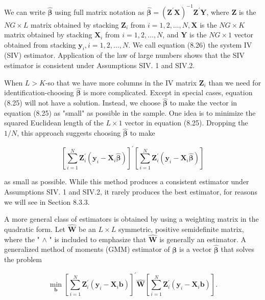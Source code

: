 \documentclass[10pt]{article}
\begin{document}
We can write $\hat{\boldsymbol{\beta}}$ using full matrix notation as $\hat{\boldsymbol{\beta}}=\left(\mathbf{Z}^{\prime} \mathbf{X}\right)^{-1} \mathbf{Z}^{\prime} \mathbf{Y}$, where $\mathbf{Z}$ is the $N G \times L$ matrix obtained by stacking $\mathbf{Z}_{i}$ from $i=1,2, \ldots, N, \mathbf{X}$ is the $N G \times K$ matrix obtained by stacking $\mathbf{X}_{i}$ from $i=1,2, \ldots, N$, and $\mathbf{Y}$ is the $N G \times 1$ vector obtained from stacking $\mathbf{y}_{i}, i=1,2, \ldots, N$. We call equation (8.26) the system IV (SIV) estimator. Application of the law of large numbers shows that the SIV estimator is consistent under Assumptions SIV. 1 and SIV.2.

When $L>K$-so that we have more columns in the IV matrix $\mathbf{Z}_{i}$ than we need for identification-choosing $\hat{\boldsymbol{\beta}}$ is more complicated. Except in special cases, equation (8.25) will not have a solution. Instead, we choose $\hat{\boldsymbol{\beta}}$ to make the vector in equation (8.25) as "small" as possible in the sample. One idea is to minimize the squared Euclidean length of the $L \times 1$ vector in equation (8.25). Dropping the $1 / N$, this approach suggests choosing $\hat{\boldsymbol{\beta}}$ to make

$$
\left[\sum_{i=1}^{N} \mathbf{Z}_{i}^{\prime}\left(\mathbf{y}_{i}-\mathbf{X}_{i} \hat{\boldsymbol{\beta}}\right)\right]^{\prime}\left[\sum_{i=1}^{N} \mathbf{Z}_{i}^{\prime}\left(\mathbf{y}_{i}-\mathbf{X}_{i} \hat{\boldsymbol{\beta}}\right)\right]
$$

as small as possible. While this method produces a consistent estimator under Assumptions SIV. 1 and SIV.2, it rarely produces the best estimator, for reasons we will see in Section 8.3.3.

A more general class of estimators is obtained by using a weighting matrix in the quadratic form. Let $\hat{\mathbf{W}}$ be an $L \times L$ symmetric, positive semidefinite matrix, where the " $\wedge$ " is included to emphasize that $\hat{\mathbf{W}}$ is generally an estimator. A generalized method of moments (GMM) estimator of $\boldsymbol{\beta}$ is a vector $\hat{\boldsymbol{\beta}}$ that solves the problem


\begin{equation*}
\min _{\mathbf{b}}\left[\sum_{i=1}^{N} \mathbf{Z}_{i}^{\prime}\left(\mathbf{y}_{i}-\mathbf{X}_{i} \mathbf{b}\right)\right]^{\prime} \hat{\mathbf{W}}\left[\sum_{i=1}^{N} \mathbf{Z}_{i}^{\prime}\left(\mathbf{y}_{i}-\mathbf{X}_{i} \mathbf{b}\right)\right] . \tag{8.27}
\end{equation*}
\end{document}
